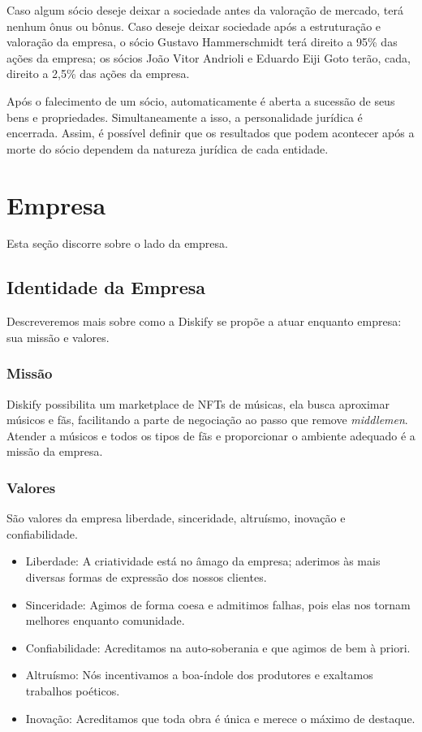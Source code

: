 \documentclass[onecolumn,12pt]{asme2ej}
\begin{document}
Caso algum sócio deseje deixar a sociedade antes da valoração de mercado, terá nenhum ônus ou bônus. Caso deseje deixar sociedade após a estruturação e valoração da empresa, o sócio Gustavo Hammerschmidt terá direito a 95\% das ações da empresa; os sócios João Vitor Andrioli e Eduardo Eiji Goto terão, cada, direito a 2,5\% das ações da empresa. 

Após o falecimento de um sócio, automaticamente é aberta a sucessão de seus bens e propriedades. Simultaneamente a isso, a personalidade jurídica é encerrada. Assim, é possível definir que os resultados que podem acontecer após a morte do sócio dependem da natureza jurídica de cada entidade. 

\section{Empresa}

Esta seção discorre sobre o lado da empresa.

\subsection{Identidade da Empresa}

Descreveremos mais sobre como a Diskify se propõe a atuar enquanto empresa: sua missão e valores.

\subsubsection{Missão}

Diskify possibilita um marketplace de NFTs de músicas, ela busca aproximar músicos e fãs, facilitando a parte de negociação ao passo que remove {\it middlemen}. Atender a músicos e todos os tipos de fãs e proporcionar o ambiente adequado é a missão da empresa.

\subsubsection{Valores}
São valores da empresa liberdade, sinceridade, altruísmo, inovação e confiabilidade.

\begin{itemize}
\item Liberdade: A criatividade está no âmago da empresa; aderimos às mais diversas formas de expressão dos nossos clientes.
\item Sinceridade: Agimos de forma coesa e admitimos falhas, pois elas nos tornam melhores enquanto comunidade.
\item Confiabilidade: Acreditamos na auto-soberania e que agimos de bem à priori.
\item Altruísmo: Nós incentivamos a boa-índole dos produtores e exaltamos trabalhos poéticos.
\item Inovação: Acreditamos que toda obra é única e merece o máximo de destaque.
\end{itemize}
\end{document}
